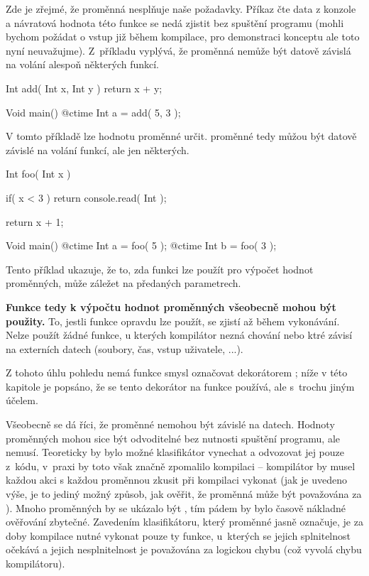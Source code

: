Zde je zřejmé, že proměnná  nesplňuje naše požadavky. Příkaz  čte data z konzole a návratová hodnota této funkce se nedá zjistit bez spuštění programu (mohli bychom požádat o vstup již během kompilace, pro demonstraci konceptu ale toto nyní neuvažujme). Z~příkladu vyplývá, že \ctime proměnná nemůže být datově závislá na volání alespoň některých funkcí.

\begin{code}
Int add( Int x, Int y ) {
	return x + y;
}

Void main() {
	@ctime Int a = add( 5, 3 );
}
\end{code}
V tomto příkladě lze hodnotu proměnné  určit. \ctime proměnné tedy můžou být datově závislé na volání funkcí, ale jen některých.

\begin{code}
Int foo( Int x ) {
	if( x < 3 )
		return console.read( Int );

	return x + 1;
}

Void main() {
	@ctime Int a = foo( 5 );
	@ctime Int b = foo( 3 );
}
\end{code}

Tento příklad ukazuje, že to, zda funkci lze použít pro výpočet hodnot \ctime proměnných, může záležet na předaných parametrech.

\textbf{Funkce tedy k výpočtu hodnot \ctime proměnných všeobecně mohou být použity.} To, jestli funkce opravdu lze použít, se zjistí až během vykonávání. Nelze použít žádné funkce, u kterých kompilátor nezná chování nebo ktré závisí na externích datech (soubory, čas, vstup uživatele, ...).

Z tohoto úhlu pohledu nemá funkce smysl označovat dekorátorem ; níže v této kapitole je popsáno, že se tento dekorátor na funkce používá, ale s~trochu jiným účelem.

Všeobecně se dá říci, že \ctime proměnné nemohou být závislé na \nonctime datech. Hodnoty \nonctime proměnných mohou sice být odvoditelné bez nutnosti spuštění programu, ale nemusí. Teoreticky by bylo možné klasifikátor vynechat a odvozovat jej pouze z~kódu, v~praxi by toto však značně zpomalilo kompilaci -- kompilátor by musel každou akci s každou proměnnou zkusit při kompilaci vykonat (jak je uvedeno výše, je to jediný možný způsob, jak ověřit, že proměnná může být považována za \ctime). Mnoho proměnných by se ukázalo být \nonctime, tím pádem by bylo časově nákladné ověřování zbytečné. Zavedením klasifikátoru, který \ctime proměnné jasně označuje, je za doby kompilace nutné vykonat pouze ty funkce, u~kterých se jejich splnitelnost očekává a jejich nesplnitelnost je považována za logickou chybu (což vyvolá chybu kompilátoru).


